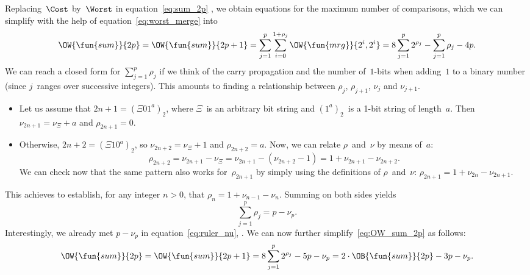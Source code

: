 Replacing~\(\Cost\) by~\(\Worst\) in equation~\eqref{eq:sum_2p}
, we obtain equations for the maximum number of
comparisons, which we can simplify with the help of
equation~\eqref{eq:worst_merge}  into
\begin{equation}
\OW{\fun{sum}}{2p}
  = \OW{\fun{sum}}{2p+1}
  = \sum_{j=1}^{p}\sum_{i=0}^{1+\rho_{j}}{\OW{\fun{mrg}}{2^i,2^i}}
  = 8\sum_{j=1}^{p}{2^{\rho_j}} - \sum_{j=1}^{p}\rho_j - 4p.
\label{eq:OW_sum_2p}
\index{sum@$\OW{\fun{sum}}{n}$}
\end{equation}
  We can reach a closed form
for \(\sum_{j=1}^{p}\rho_j\) if we think of the carry propagation and
the number of~\(1\)-bits when adding~\(1\) to a binary number (since
\(j\)~ranges over successive integers). This amounts to finding a
relationship between \(\rho_j\), \(\rho_{j+1}\), \(\nu_j\) and
\(\nu_{j+1}\).
\begin{itemize}

  \item Let us assume that \(2n+1 = (\Xi 01^a)_2\), where \(\Xi\)~is
    an arbitrary bit string and \((1^a)_2\)~is a 1-bit string of
    length~\(a\). Then \(\nu_{2n+1} = \nu_{\Xi} + a\) and
    \(\rho_{2n+1} = 0\).

  \item Otherwise, \(2n+2 = (\Xi 10^a)_2\), so \(\nu_{2n+2} =
    \nu_{\Xi} + 1\) and \(\rho_{2n+2} = a\). Now, we can relate
    \(\rho\)~and~\(\nu\) by means of~\(a\):
    \begin{equation*}
      \rho_{2n+2} = \nu_{2n+1} - \nu_{\Xi} = \nu_{2n+1} - (\nu_{2n+2} - 1)
      = 1 + \nu_{2n+1} - \nu_{2n+2}.
    \end{equation*}
    We can check now that the same pattern also works
    for~\(\rho_{2n+1}\) by simply using the definitions of
    \(\rho\)~and~\(\nu\): \(\rho_{2n+1} = 1 + \nu_{2n} - \nu_{2n+1}\).
\end{itemize}
This achieves to establish, for any integer \(n>0\), that \(\rho_n = 1
+ \nu_{n-1} - \nu_{n}\). Summing on both sides yields
\begin{equation*}
\sum_{j=1}^{p}{\rho_j} = p - \nu_p.
\end{equation*}
Interestingly, we already met \(p - \nu_p\)  in equation~\eqref{eq:ruler_nu},
. We can now further
simplify~\eqref{eq:OW_sum_2p} as follows:
\begin{equation*}
\OW{\fun{sum}}{2p}
 = \OW{\fun{sum}}{2p+1}
 = 8\sum_{j=1}^{p}{2^{\rho_j}} - 5p - \nu_p
 = 2 \cdot \OB{\fun{sum}}{2p} - 3p - \nu_p.
\index{sum@$\OW{\fun{sum}}{n}$}
\end{equation*}

